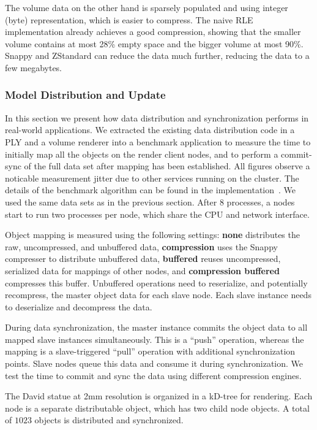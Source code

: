 \documentclass[10pt,journal,compsoc]{IEEEtran}
\begin{document}
The volume data on the other hand is sparsely populated and using integer (byte)
representation, which is easier to compress. The naive RLE implementation
already achieves a good compression, showing that the smaller volume contains at
most 28\% empty space and the bigger volume at most 90\%. Snappy and ZStandard
can reduce the data much further, reducing the data to a few megabytes.


\subsubsection{Model Distribution and Update}

In this section we present how data distribution and synchronization performs in
real-world applications. We extracted the existing data distribution code in a
PLY and a volume renderer into a benchmark application to measure the time to
initially map all the objects on the render client nodes, and to perform a
commit-sync of the full data set after mapping has been established. All figures
observe a noticable measurement jitter due to other services running on the
cluster. The details of the benchmark algorithm can be found in the
implementation~\cite{eqObjectBench}. We used the same data sets as in the
previous section. After $8$ processes, a nodes start to run two processes per
node, which share the CPU and network interface.

Object mapping is measured using the following settings: \textbf{none}
distributes the raw, uncompressed, and unbuffered data, \textbf{compression}
uses the Snappy compresser to distribute unbuffered data, \textbf{buffered}
reuses uncompressed, serialized data for mappings of other nodes, and
\textbf{compression buffered} compresses this buffer. Unbuffered operations need
to reserialize, and potentially recompress, the master object data for each
slave node. Each slave instance needs to deserialize and decompress the data.

During data synchronization, the master instance commits the object data to all
mapped slave instances simultaneously. This is a ``push'' operation, whereas the
mapping is a slave-triggered ``pull'' operation with additional synchronization
points. Slave nodes queue this data and consume it during synchronization. We
test the time to commit and sync the data using different compression engines.

The David statue at 2mm resolution is organized in a kD-tree for rendering. Each
node is a separate distributable object, which has two child node objects. A
total of $1023$ objects is distributed and synchronized.
\end{document}
